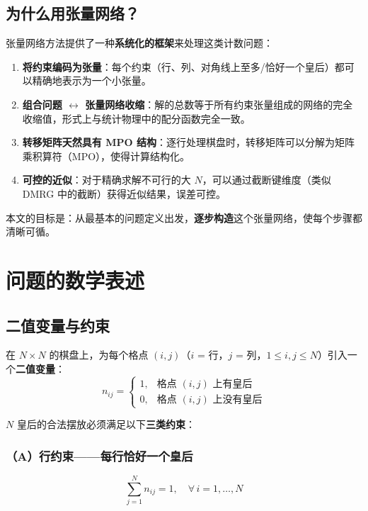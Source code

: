 \documentclass[12pt,a4paper]{ctexart}
\begin{document}
\subsection{为什么用张量网络？}

张量网络方法提供了一种\textbf{系统化的框架}来处理这类计数问题：

\begin{enumerate}
    \item \textbf{将约束编码为张量}：每个约束（行、列、对角线上至多/恰好一个皇后）都可以精确地表示为一个小张量。
    \item \textbf{组合问题 $\leftrightarrow$ 张量网络收缩}：解的总数等于所有约束张量组成的网络的完全收缩值，形式上与统计物理中的配分函数完全一致。
    \item \textbf{转移矩阵天然具有 MPO 结构}：逐行处理棋盘时，转移矩阵可以分解为矩阵乘积算符（MPO），使得计算结构化。
    \item \textbf{可控的近似}：对于精确求解不可行的大 $N$，可以通过截断键维度（类似 DMRG 中的截断）获得近似结果，误差可控。
\end{enumerate}

本文的目标是：从最基本的问题定义出发，\textbf{逐步构造}这个张量网络，使每个步骤都清晰可循。

\section{问题的数学表述}

\subsection{二值变量与约束}

在 $N \times N$ 的棋盘上，为每个格点 $(i,j)$（$i$ = 行，$j$ = 列，$1 \leq i,j \leq N$）引入一个\textbf{二值变量}：
\begin{equation}
n_{ij} = \begin{cases} 1, & \text{格点 $(i,j)$ 上有皇后} \\ 0, & \text{格点 $(i,j)$ 上没有皇后} \end{cases}
\end{equation}

$N$ 皇后的合法摆放必须满足以下\textbf{三类约束}：

\subsubsection*{（A）行约束——每行恰好一个皇后}
\begin{equation}
\sum_{j=1}^{N} n_{ij} = 1, \quad \forall\, i = 1, \ldots, N
\end{equation}
\end{document}
